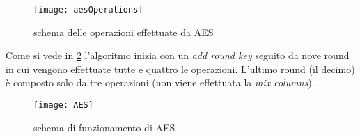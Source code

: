 				\begin{figure}
					\begin{center}
						\texttt{[image: aesOperations]}
						\caption{schema delle operazioni effettuate da AES}
						\label{fig:operations}
					\end{center}
				\end{figure}
			
				Come si vede in \cref{fig:aes} l'algoritmo inizia con un \emph{add round key} seguito da nove round in cui vengono effettuate tutte e quattro le operazioni. L'ultimo round (il decimo) è composto solo da tre operazioni (non viene effettuata la \emph{mix columns}). 
				
				\begin{figure}
					\begin{center}
						\texttt{[image: AES]}
						\caption{schema di funzionamento di AES}
						\label{fig:aes}
					\end{center}
				\end{figure}
				
